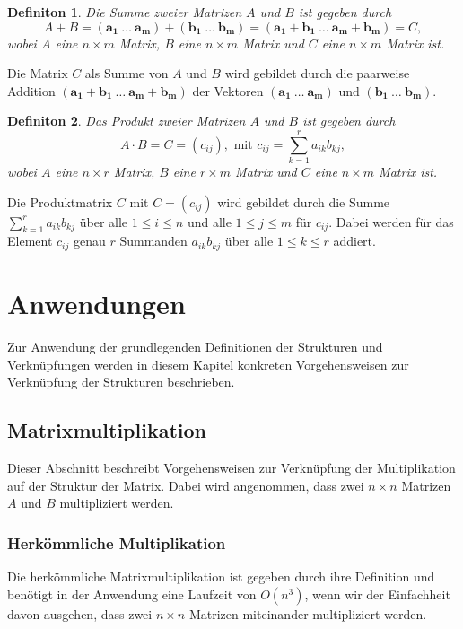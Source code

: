 \documentclass[oneside]{scrbook}
\newtheorem{definition}{Definiton}[section]
\numberwithin{equation}{section}
\begin{document}
\begin{definition}
	Die Summe zweier Matrizen $A$ und $B$ ist gegeben durch 
	$$A + B = (\boldsymbol{a_1} \: \ldots \: \boldsymbol{a_m}) + (\boldsymbol{b_1} \: \ldots \: \boldsymbol{b_m}) = (\boldsymbol{a_1} + \boldsymbol{b_1} \: \ldots \: \boldsymbol{a_m} + \boldsymbol{b_m}) = C,$$ wobei $A$ eine $n \times m$ Matrix, $B$ eine $n \times m$ Matrix und $C$ eine $n \times m$ Matrix ist.
\end{definition}
Die Matrix $C$ als Summe von $A$ und $B$ wird gebildet durch die paarweise Addition $(\boldsymbol{a_1} + \boldsymbol{b_1} \: \ldots \: \boldsymbol{a_m} + \boldsymbol{b_m})$ der Vektoren $(\boldsymbol{a_1} \: \ldots \: \boldsymbol{a_m})$ und $(\boldsymbol{b_1} \: \ldots \: \boldsymbol{b_m})$.
\begin{definition}
	Das Produkt zweier Matrizen $A$ und $B$ ist gegeben durch 
	$$A \cdot B = C = (c_{ij}), \text{ mit } c_{ij} = \sum_{k=1}^{r}a_{ik}b_{kj},$$ wobei $A$ eine $n \times r$ Matrix, $B$ eine $r \times m$ Matrix und $C$ eine $n \times m$ Matrix ist.
\end{definition}
Die Produktmatrix $C$ mit $C = (c_{ij})$ wird gebildet durch die Summe $\sum_{k=1}^{r}a_{ik}b_{kj}$ über alle $1 \leq i \leq n$ und alle $1 \leq j \leq m$ für $c_{ij}$. Dabei werden für das Element $c_{ij}$ genau $r$ Summanden $a_{ik}b_{kj}$ über alle $1 \leq k \leq r$ addiert.

\chapter{Anwendungen}
Zur Anwendung der grundlegenden Definitionen der Strukturen und Verknüpfungen werden in diesem Kapitel konkreten Vorgehensweisen zur Verknüpfung der Strukturen beschrieben.

\section{Matrixmultiplikation}
Dieser Abschnitt beschreibt Vorgehensweisen zur Verknüpfung der Multiplikation auf der Struktur der Matrix. Dabei wird angenommen, dass zwei $n \times n$ Matrizen $A$ und $B$ multipliziert werden.

\subsection{Herkömmliche Multiplikation}
Die herkömmliche Matrixmultiplikation ist gegeben durch ihre Definition und benötigt in der Anwendung eine Laufzeit von $O(n^3)$, wenn wir der Einfachheit davon ausgehen, dass zwei $n \times n$ Matrizen miteinander multipliziert werden.
\end{document}
